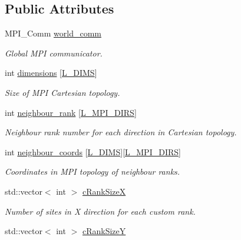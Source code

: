 \subsection*{Public Attributes}
\begin{DoxyCompactItemize}
\item 
M\+P\+I\+\_\+\+Comm \hyperlink{class_mpi_manager_aec1ed834d1a8fa19f87499fb0d5cd332}{world\+\_\+comm}
\begin{DoxyCompactList}\small\item\em Global M\+PI communicator. \end{DoxyCompactList}\item 
int \hyperlink{class_mpi_manager_a8d486f77671328cdc139f6cef2a4006f}{dimensions} \mbox{[}\hyperlink{definitions_8h_a31d5945080ee5c34edc32e6f74c724c8}{L\+\_\+\+D\+I\+MS}\mbox{]}
\begin{DoxyCompactList}\small\item\em Size of M\+PI Cartesian topology. \end{DoxyCompactList}\item 
int \hyperlink{class_mpi_manager_af2891954ff504c12ec6d5f845e906f28}{neighbour\+\_\+rank} \mbox{[}\hyperlink{definitions_8h_a144328eed4e90ebcf8a9f66aa7337266}{L\+\_\+\+M\+P\+I\+\_\+\+D\+I\+RS}\mbox{]}
\begin{DoxyCompactList}\small\item\em Neighbour rank number for each direction in Cartesian topology. \end{DoxyCompactList}\item 
int \hyperlink{class_mpi_manager_a5a7268347fcab916adc61bee47e9f626}{neighbour\+\_\+coords} \mbox{[}\hyperlink{definitions_8h_a31d5945080ee5c34edc32e6f74c724c8}{L\+\_\+\+D\+I\+MS}\mbox{]}\mbox{[}\hyperlink{definitions_8h_a144328eed4e90ebcf8a9f66aa7337266}{L\+\_\+\+M\+P\+I\+\_\+\+D\+I\+RS}\mbox{]}
\begin{DoxyCompactList}\small\item\em Coordinates in M\+PI topology of neighbour ranks. \end{DoxyCompactList}\item 
std\+::vector$<$ int $>$ \hyperlink{class_mpi_manager_a54ce152f90bd51ff99f71e1011983977}{c\+Rank\+SizeX}
\begin{DoxyCompactList}\small\item\em Number of sites in X direction for each custom rank. \end{DoxyCompactList}\item 
std\+::vector$<$ int $>$ \hyperlink{class_mpi_manager_a4d583991c966c8eb44a52cbbb6ae4662}{c\+Rank\+SizeY}

\end{DoxyCompactItemize}
